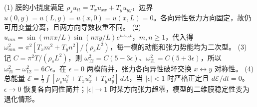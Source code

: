 (1) 膜的小挠度满足 \(\rho_s u_{tt}=T_xu_{xx}+T_yu_{yy}\)，边界 \(u(0,y)=u(L,y)=u(x,0)=u(x,L)=0\)。各向异性张力方向固定，故仍可用变量分离，且两方向导数权重不同。
(2) \(u_{mn}=\sin(m\pi x/L)\sin(n\pi y/L)e^{i\omega_{mn}t}\)，\(m,n\ge1\)，代入得 \(\omega_{mn}^2=\pi^2[T_xm^2+T_yn^2]/(\rho_sL^2)\)，每一模的动能和张力势能均为二次型。
(3) 记 \(C=\pi^2T/(\rho_sL^2)\)，则 \(\omega_{12}^2=C(5-3\epsilon)\)、\(\omega_{21}^2=C(5+3\epsilon)\)，所以 \(\omega_{21}^2-\omega_{12}^2=6C\epsilon\)。在 \(\epsilon=0\) 两模简并，张力各向异性破坏交换 \(x\leftrightarrow y\) 对称性。
(4) 总能量 \(\mathcal E=\frac12\int[\rho_su_t^2+T_xu_x^2+T_yu_y^2]\,dA\)，当 \(|\epsilon|<1\) 时严格正定且 \(d\mathcal E/dt=0\)。\(\epsilon\to0\) 恢复各向同性简并；\(|\epsilon|\to1\) 时某方向张力趋零，模型的二维膜稳定性变为退化情形。
